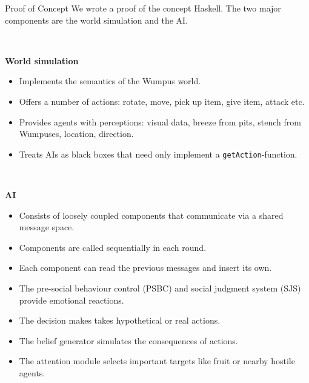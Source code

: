 \documentclass[final,hyperref={pdfpagelabels=false}]{beamer}
\begin{document}
\begin{frame}
\begin{columns}[t]
        \begin{column}{.45\textwidth}            
            \begin{block}{Proof of Concept}
            	We wrote a proof of the concept Haskell. The two major components are the world simulation and the AI.
                
                $~$
                
                \textbf{World simulation}
                \begin{itemize}
                    \item Implements the semantics of the Wumpus world.
                    \item Offers a number of actions: rotate, move, pick up item, give item, attack etc.
                    \item Provides agents with perceptions: visual data, breeze from pits, stench from Wumpuses, location, direction.
                    \item Treats AIs as black boxes that need only implement a \texttt{getAction}-function.
                \end{itemize}
                
                $~$
                
                \textbf{AI}
                \begin{itemize}
                    \item Consists of loosely coupled components that communicate via a shared message space.
                    \item Components are called sequentially in each round.
                    \item Each component can read the previous messages and insert its own.
                    \item The pre-social behaviour control (PSBC) and social judgment system (SJS) provide emotional reactions.
                    \item The decision makes takes hypothetical or real actions.
                    \item The belief generator simulates the consequences of actions.
                    \item The attention module selects important targets like fruit or nearby hostile agents.
                \end{itemize}
                

\end{block}
\end{column}
\end{columns}
\end{frame}
\end{document}
